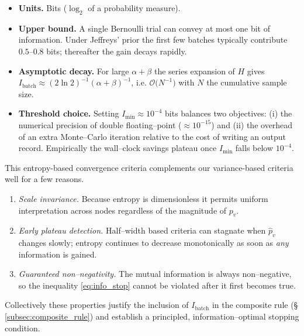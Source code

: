 \begin{itemize}
  \item \textbf{Units.}  Bits ($\log_2$ of a probability measure).
  \item \textbf{Upper bound.}  A single Bernoulli trial can convey at most
        one bit of information.  Under Jeffreys' prior the first few
        batches typically contribute $0.5$--$0.8$ bits; thereafter the gain
        decays rapidly.
  \item \textbf{Asymptotic decay.}  For large $\alpha+\beta$ the series
        expansion of $H$ gives $I_{\text{batch}}\approx(2\ln 2)^{-1}
        (\alpha+\beta)^{-1}$, i.e.
        $\mathcal{O}\!\bigl(N^{-1}\bigr)$ with $N$ the cumulative sample
        size.
  \item \textbf{Threshold choice.}  Setting $I_{\min}\approx10^{-4}$ bits
        balances two objectives: (i) the numerical precision of double
        floating--point ($\approx10^{-15}$) and (ii) the overhead of an
        extra Monte--Carlo iteration relative to the cost of writing an
        output record.  Empirically the wall--clock savings plateau once
        $I_{\min}$ falls below $10^{-4}$.
\end{itemize}

This entropy-based convergence criteria complements our variance-based criteria well for a few reasons.

\begin{enumerate}
  \item \emph{Scale invariance.}  Because entropy is dimensionless it
        permits uniform interpretation across nodes regardless of the
        magnitude of $p_v$.
  \item \emph{Early plateau detection.}  Half--width based criteria can
        stagnate when $\widehat{p}_v$ changes slowly; entropy continues to
        decrease monotonically as soon as \emph{any} information is gained.
  \item \emph{Guaranteed non--negativity.}  The mutual information is always
        non–negative, so the inequality \eqref{eq:info_stop} cannot be
        violated after it first becomes true.
\end{enumerate}

Collectively these properties justify the inclusion of
$I_{\text{batch}}$ in the composite rule (§\,\ref{subsec:composite_rule})
and establish a principled, information--optimal stopping condition.

